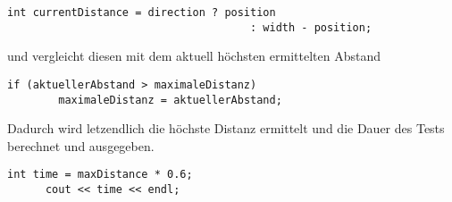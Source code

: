 \documentclass[12pt]{scrartcl}
\begin{document}
      \vspace{12pt}
      \begin{lstlisting}[style=c++]
      int currentDistance = direction ? position
                                      : width - position;
      \end{lstlisting}

      \vspace{12pt}\noindent
      und vergleicht diesen mit dem aktuell h{\"o}chsten ermittelten Abstand

      \vspace{12pt}
      \begin{lstlisting}[style=c++]
      if (aktuellerAbstand > maximaleDistanz)
        maximaleDistanz = aktuellerAbstand;
      \end{lstlisting}

      \vspace{12pt}\noindent
      Dadurch wird letzendlich die h{\"o}chste Distanz ermittelt und die Dauer des Tests berechnet und ausgegeben.

      \vspace{12pt}
      \begin{lstlisting}[style=c++]
      int time = maxDistance * 0.6;
      cout << time << endl;
      \end{lstlisting}
\end{document}

